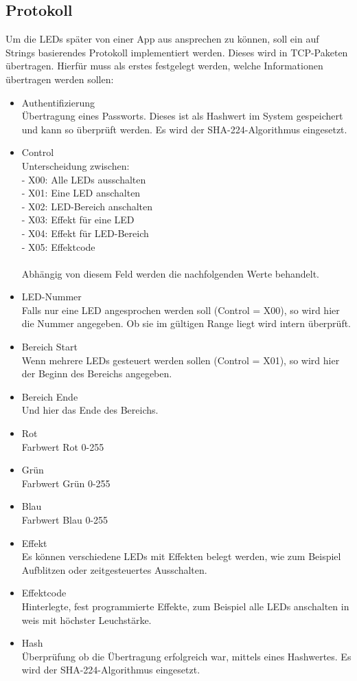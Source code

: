 
\subsection{Protokoll}
Um die LEDs später von einer App aus ansprechen zu können, soll ein auf Strings basierendes Protokoll implementiert werden. Dieses wird in TCP-Paketen übertragen. Hierfür muss als erstes festgelegt werden, welche Informationen übertragen werden sollen: \\
\begin{itemize}
\item Authentifizierung\\
Übertragung eines Passworts. Dieses ist als Hashwert im System gespeichert und kann so überprüft werden. Es wird der SHA-224-Algorithmus eingesetzt.
\item Control\\
Unterscheidung zwischen:\\
	- X00: Alle LEDs ausschalten\\
	- X01: Eine LED anschalten\\
	- X02: LED-Bereich anschalten\\
	- X03: Effekt für eine LED\\
	- X04: Effekt für LED-Bereich\\
	- X05: Effektcode \\\\
Abhängig von diesem Feld werden die nachfolgenden Werte behandelt. 
\item LED-Nummer\\
Falls nur eine LED angesprochen werden soll (Control = X00), so wird hier die Nummer angegeben. Ob sie im gültigen Range liegt wird intern überprüft.
\item Bereich Start\\
Wenn mehrere LEDs gesteuert werden sollen (Control = X01), so wird hier der Beginn des Bereichs angegeben.
\item Bereich Ende\\
Und hier das Ende des Bereichs. 
\item Rot\\
Farbwert Rot 0-255
\item Grün\\
Farbwert Grün 0-255
\item Blau\\
Farbwert Blau 0-255
\item Effekt\\
Es können verschiedene LEDs mit Effekten belegt werden, wie zum Beispiel Aufblitzen oder zeitgesteuertes Ausschalten.
\item Effektcode\\
Hinterlegte, fest programmierte Effekte, zum Beispiel alle LEDs anschalten in weis mit höchster Leuchstärke.
\item Hash\\
Überprüfung ob die Übertragung erfolgreich war, mittels eines Hashwertes. Es wird der SHA-224-Algorithmus eingesetzt.
\end{itemize}
